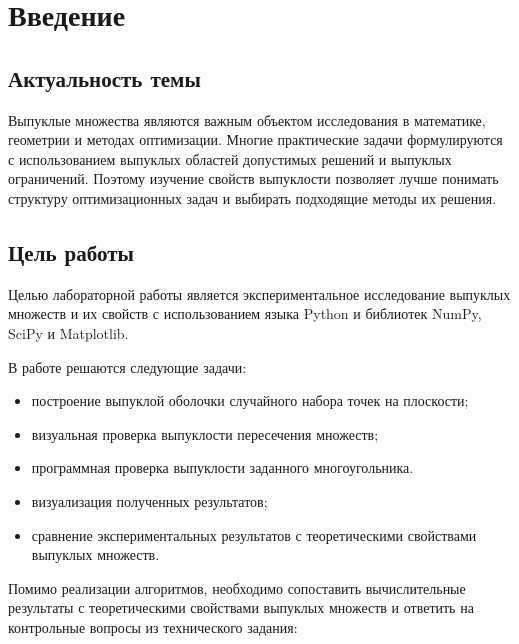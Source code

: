 \section{Введение}

\subsection{Актуальность темы}
Выпуклые множества являются важным объектом исследования в математике,
геометрии и методах оптимизации. Многие практические задачи формулируются
с использованием выпуклых областей допустимых решений и выпуклых
ограничений. Поэтому изучение свойств выпуклости позволяет лучше понимать
структуру оптимизационных задач и выбирать подходящие методы их решения.


\subsection{Цель работы}
Целью лабораторной работы является экспериментальное исследование выпуклых множеств и их свойств с использованием языка Python и библиотек NumPy, SciPy и Matplotlib.

В работе решаются следующие задачи:
\begin{itemize}
	\item построение выпуклой оболочки случайного набора точек на плоскости;
	\item визуальная проверка выпуклости пересечения множеств;
	\item программная проверка выпуклости заданного многоугольника.
	\item визуализация полученных результатов;
    \item сравнение экспериментальных результатов с теоретическими
    свойствами выпуклых множеств.
\end{itemize}

Помимо реализации алгоритмов, необходимо сопоставить вычислительные
результаты с теоретическими свойствами выпуклых множеств и ответить на
контрольные вопросы из технического задания:


